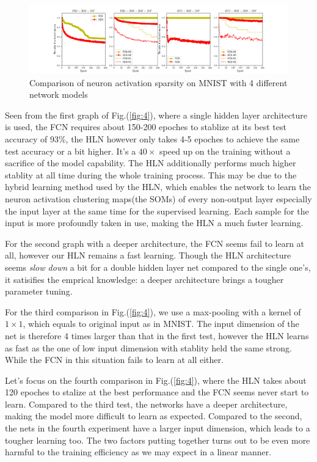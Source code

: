 \documentclass[3p,times,procedia]{elsarticle}
\begin{document}
\begin{figure}[h]
	\centerline{
		\includegraphics[width=7in]{mnist_training_sparsity}}
	\caption{
		Comparison of neuron activation sparsity 
on MNIST with 4 different network models
		}
	\label{fig:6}
\end{figure}

Seen from the first graph of Fig.(\ref{fig:4}), 
where a single hidden layer architecture is used,
the FCN requires about 150-200 epoches to stablize 
at its best test accuracy of 93\%, the HLN however 
only takes 4-5 epoches to achieve the same test 
accuracy or a bit higher. 
It's a $40\times$ speed up 
on the training without a sacrifice of the
model capability. The HLN additionally performs
much higher stablity at all time during the whole
training process. This may be due to the hybrid 
learning method used by the HLN, which enables 
the network to learn the neuron activation 
clustering maps(the SOMs) of every non-output layer
especially the input layer at the same time for
the supervised learning. Each sample for the input
is more profoundly taken in use, making the HLN
a much faster learning.

For the second graph with a deeper architecture,
the FCN seems fail to learn at all, however our
HLN remains a fast learning. Though the HLN 
architecture seems \emph{slow down} a bit for
a double hidden layer net compared to the single
one's, it satisifies the emprical knowledge: a deeper
architecture brings a tougher parameter tuning.

For the third comparison in Fig.(\ref{fig:4}), 
we use a max-pooling with a kernel of $1\times 1$,
which equals to original input as in MNIST.
The input dimension of the net is therefore 4 
times larger than that in the first test, however
the HLN learns as fast as the one of low input
dimension with stablity held the same strong.
While the FCN in this situation fails to learn at
all either.

Let's focus on the fourth comparison in 
Fig.(\ref{fig:4}), where the HLN takes about 120
epoches to stalize at the best performance and
the FCN seems never start to learn.
Compared to the third test, the networks have a
deeper architecture, making the model more difficult
to learn as expected.  Compared to the second, the
nets in the fourth experiment
have a larger input dimension, which leads to a
tougher learning too. The two factors putting 
together turns out to be even more harmful to
the training efficiency as we may expect in a
linear manner.
\end{document}
